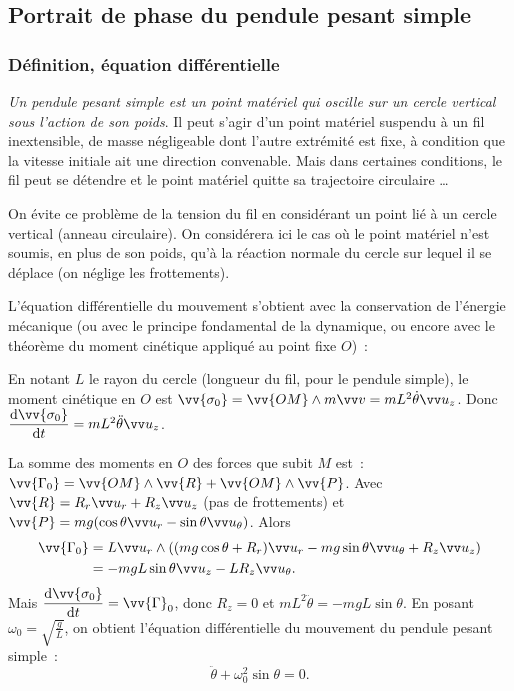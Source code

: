 \subsection{Portrait de phase du pendule pesant simple}
\label{chap5-subsec:portraitdephasepesantsimple}

\subsubsection{Définition, équation différentielle}

\emph{Un pendule pesant simple est un point matériel qui oscille sur un cercle vertical sous l'action de son poids}. Il peut s'agir d'un point matériel suspendu à un fil inextensible, de masse négligeable dont l'autre extrémité est fixe, à condition que la vitesse initiale ait une direction convenable. Mais dans certaines conditions, le fil peut se détendre et le point matériel quitte sa trajectoire circulaire \ldots

On évite ce problème de la tension du fil en considérant un point lié à un cercle vertical (anneau circulaire). On considérera ici le cas où le point matériel n'est soumis, en plus de son poids, qu'à la réaction normale du cercle sur lequel il se déplace (on néglige les frottements).

L'équation différentielle du mouvement s'obtient avec la conservation de l'énergie mécanique (ou avec le principe fondamental de la dynamique, ou encore avec le théorème du moment cinétique appliqué au point fixe $O$)~:

En notant $L$ le rayon du cercle (longueur du fil, pour le pendule simple), le moment cinétique en $O$ est $\vv{\sigma_0} = \vv{OM}\wedge m \vvv = mL^2\dot{\theta}\uz$. Donc $\derived{\vv{\sigma_0}}{t}=mL^2\ddot{\theta}\uz$.

La somme des moments en $O$ des forces que subit $M$ est~: $\vv{\Gamma_0}=\vv{OM}\wedge\vv{R}+\vv{OM}\wedge\vv{P}$. Avec $\vv{R} = R_r \ur +R_z \uz$ (pas de frottements) et $\vv{P}=mg(\cos\theta \ur -\sin\theta \utheta)$. Alors
\begin{align}
  \vv{\Gamma_0} &= L \ur \wedge \left( (mg\cos\theta +R_r)\ur - mg\sin\theta\utheta +R_z\uz\right) \\ 
  & = -mgL\sin\theta\uz - LR_z\utheta.
\end{align}
Mais $\derived{\vv{\sigma_0}}{t} = \vv{\Gamma}_0$, donc $R_z=0$ et $mL^2\ddot{\theta}=-mgL\sin\theta$. En posant $\omega_0 = \sqrt{\frac{g}{L}}$, on obtient l'équation différentielle du mouvement du pendule pesant simple~:
\begin{equation}
  \ddot{\theta} + \omega_0^2\sin\theta =0.
\end{equation}

